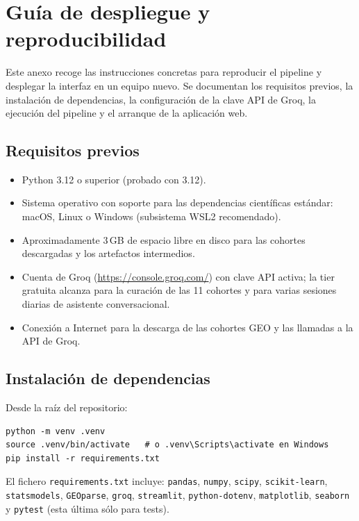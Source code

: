 \chapter{Guía de despliegue y reproducibilidad}
\label{anexo:despliegue}

Este anexo recoge las instrucciones concretas para reproducir el
pipeline y desplegar la interfaz en un equipo nuevo. Se documentan los
requisitos previos, la instalación de dependencias, la configuración de
la clave API de Groq, la ejecución del pipeline y el arranque de la
aplicación web.

\section*{Requisitos previos}
{}

\begin{itemize}
  \item Python 3.12 o superior (probado con 3.12).
  \item Sistema operativo con soporte para las dependencias científicas
  estándar: macOS, Linux o Windows (subsistema WSL2 recomendado).
  \item Aproximadamente 3\,GB de espacio libre en disco para las
  cohortes descargadas y los artefactos intermedios.
  \item Cuenta de Groq (\url{https://console.groq.com/}) con clave API
  activa; la tier gratuita alcanza para la curación de las 11 cohortes
  y para varias sesiones diarias de asistente conversacional.
  \item Conexión a Internet para la descarga de las cohortes GEO y las
  llamadas a la API de Groq.
\end{itemize}

\section*{Instalación de dependencias}
{}

Desde la raíz del repositorio:

\begin{lstlisting}[style=bash, caption={Instalación en entorno virtual.}]
python -m venv .venv
source .venv/bin/activate   # o .venv\Scripts\activate en Windows
pip install -r requirements.txt
\end{lstlisting}

El fichero \texttt{requirements.txt} incluye:
\texttt{pandas}, \texttt{numpy}, \texttt{scipy}, \texttt{scikit-learn},
\texttt{statsmodels}, \texttt{GEOparse}, \texttt{groq},
\texttt{streamlit}, \texttt{python-dotenv}, \texttt{matplotlib},
\texttt{seaborn} y \texttt{pytest} (esta última sólo para tests).

